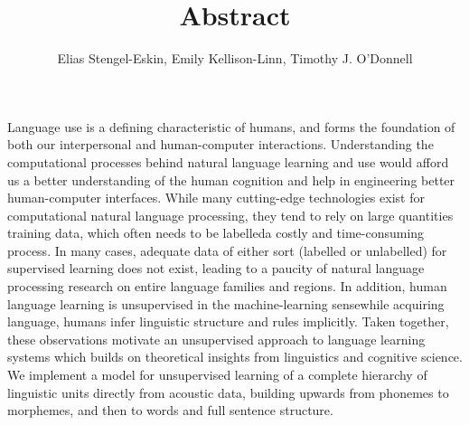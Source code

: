 \documentclass[12pt,letterpaper]{article}
\title{\vspace{-1.5cm} Abstract}
\author{Elias Stengel-Eskin, Emily Kellison-Linn, Timothy J. O'Donnell}
\newif\ifcomments
\newcommand{\cm}[1]{\textcolor{purple}{\ifcomments[COMMENT: #1]\else\fi}}
\begin{document}
\maketitle
Language use is a defining characteristic of humans, and forms the foundation of both our interpersonal and human-computer interactions.  Understanding the computational processes behind natural language learning and use would afford us a better understanding of the human cognition and help in engineering better human-computer interfaces. While many cutting-edge technologies exist for computational natural language processing, they tend to rely on large quantities training data, which often needs to be labelled\textemdash a costly and time-consuming process.
In many cases, adequate data of either sort (labelled or unlabelled) for supervised learning does not exist, leading to a paucity of natural language processing research on entire language families and regions.
In addition, human language learning is unsupervised in the machine-learning sense\textemdash while acquiring language, humans infer linguistic structure and rules implicitly.
Taken together, these observations motivate an unsupervised approach to language learning systems which builds on theoretical insights from linguistics and cognitive science. We implement a model for unsupervised learning of a complete hierarchy of linguistic units directly from acoustic data, building upwards from phonemes to morphemes, and then to words and full sentence structure. \\
\end{document}
